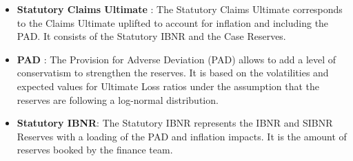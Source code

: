 \begin{itemize}
\item \textbf{Statutory Claims Ultimate} : The Statutory Claims Ultimate corresponds to the Claims Ultimate uplifted to account for inflation and including the PAD. It consists of the Statutory IBNR and the Case Reserves.
\item \textbf{PAD} : The Provision for Adverse Deviation (PAD) allows to add a level of conservatism to strengthen the reserves. It is based on the volatilities and expected values for Ultimate Loss ratios under the assumption that the reserves are following a log-normal distribution.
\item \textbf{Statutory IBNR}: The Statutory IBNR represents the IBNR and SIBNR Reserves with a loading of the PAD and inflation impacts. It is the amount of reserves booked by the finance team.
\end{itemize}
